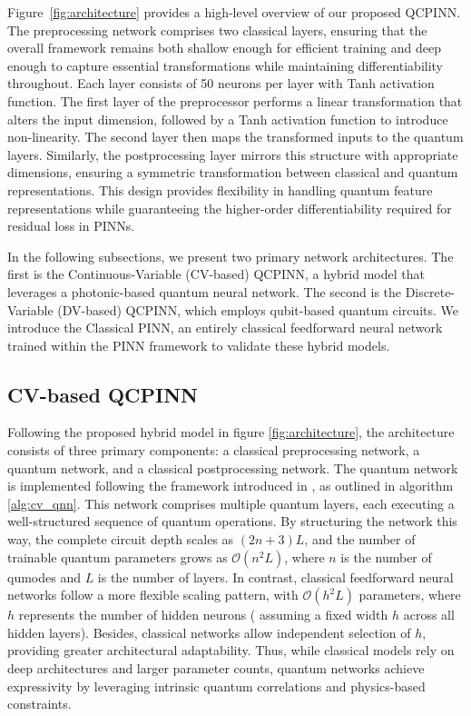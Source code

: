 Figure~\ref{fig:architecture} provides a high-level overview of our proposed QCPINN. The preprocessing network comprises two classical layers, ensuring that the overall framework remains both shallow enough for efficient training and deep enough to capture essential transformations while maintaining differentiability throughout. Each layer consists of 50 neurons per layer with Tanh activation function. The first layer of the preprocessor performs a linear transformation that alters the input dimension, followed by a Tanh activation function to introduce non-linearity. The second layer then maps the transformed inputs to the quantum layers. Similarly, the postprocessing layer mirrors this structure with appropriate dimensions, ensuring a symmetric transformation between classical and quantum representations. This design provides flexibility in handling quantum feature representations while guaranteeing the higher-order differentiability required for residual loss in PINNs.

In the following subsections, we present two primary network architectures.  The first is the Continuous-Variable (CV-based) QCPINN, a hybrid model that leverages a photonic-based quantum neural network. The second is the Discrete-Variable (DV-based) QCPINN, which employs qubit-based quantum circuits. We introduce the Classical PINN, an entirely classical feedforward neural network trained within the PINN framework to validate these hybrid models. 

\subsection{CV-based QCPINN}

Following the proposed hybrid model in figure \ref{fig:architecture}, the architecture consists of three primary components: a classical preprocessing network, a quantum network, and a classical postprocessing network. The quantum network is implemented following the framework introduced in \cite{killoran2019continuous}, as outlined in algorithm \ref{alg:cv_qnn}. This network comprises multiple quantum layers, each executing a well-structured sequence of quantum operations. By structuring the network this way, the complete circuit depth scales as $(2n+3)L$, and the number of trainable quantum parameters grows as $\mathcal{O}(n^2 L)$, where  $n$ is the number of qumodes and $L$ is the number of layers. In contrast, classical feedforward neural networks follow a more flexible scaling pattern, with $\mathcal{O}(h^2 L)$ parameters, where $h$ represents the number of hidden neurons ( assuming a fixed width $h$ across all hidden layers). Besides, classical networks allow independent selection of $h$, providing greater architectural adaptability. Thus, while classical models rely on deep architectures and larger parameter counts, quantum networks achieve expressivity by leveraging intrinsic quantum correlations and physics-based constraints.

